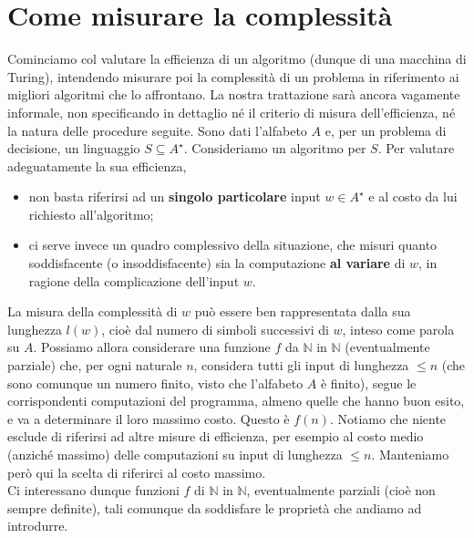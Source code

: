 \section{Come misurare la complessità}

Cominciamo col valutare la efficienza di un algoritmo (dunque di una macchina di Turing),
intendendo misurare poi la complessità di un problema in riferimento ai
migliori algoritmi che lo affrontano. La nostra trattazione sarà ancora
vagamente informale, non specificando in dettaglio né il criterio di misura
dell'efficienza, né la natura delle procedure seguite. Sono dati l'alfabeto $A$
e, per un problema di decisione, un linguaggio $S \subseteq A^{\star}$.
Consideriamo un algoritmo per $S$. Per valutare adeguatamente la sua efficienza,

\begin{itemize}
    \item non basta riferirsi ad un \textbf{singolo particolare} input $w \in A^{\star}$ e al
          costo da lui richiesto all'algoritmo;
    \item ci serve invece un quadro complessivo
          della situazione, che misuri quanto soddisfacente (o insoddisfacente) sia la
          computazione \textbf{al variare} di $w$, in ragione della complicazione dell'input $w$.
\end{itemize}


La misura della complessità di $w$ può essere ben rappresentata dalla sua
lunghezza $l(w)$, cioè dal numero di simboli successivi di $w$, inteso come
parola su $A$. Possiamo allora considerare una funzione $f$ da $\mathbb{N}$ in
$\mathbb{N}$ (eventualmente parziale) che, per ogni naturale $n$, considera
tutti gli input di lunghezza $\leq n$ (che sono comunque un numero finito, visto
che l'alfabeto $A$ è finito), segue le corrispondenti computazioni del
programma, almeno quelle che hanno buon esito, e va a determinare il loro
massimo costo. Questo è $f(n)$. Notiamo che niente esclude di riferirsi ad altre
misure di efficienza, per esempio al costo medio (anziché massimo) delle
computazioni su input di lunghezza $\leq n$. Manteniamo però qui la scelta di
riferirci al costo massimo.\\
Ci interessano dunque funzioni $f$ di $\mathbb{N}$
in $\mathbb{N}$, eventualmente parziali (cioè non sempre definite), tali
comunque da soddisfare le proprietà che andiamo ad introdurre.

